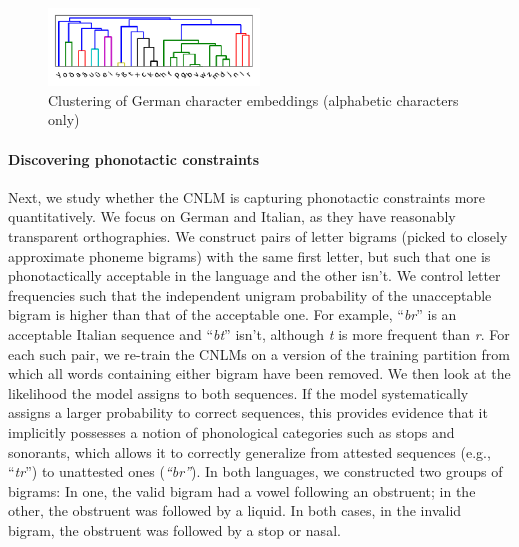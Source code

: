 \begin{figure}
\includegraphics[width=0.50\textwidth]{figures/char-emb-clustering-output_output-phonetic-wiki-german-nospaces-bptt-910515909.pdf}
\caption{Clustering of German character embeddings (alphabetic characters only)}\label{fig:char-clustering}
\end{figure}



\paragraph{Discovering phonotactic constraints}
\label{sec:phonotactics}

Next, we study whether the CNLM is capturing phonotactic constraints
more quantitatively.  We focus on German and Italian, as they
have reasonably transparent orthographies.  We construct pairs of
letter bigrams (picked to closely approximate phoneme bigrams) with
the same first letter, but such that one is phonotactically acceptable
in the language and the other isn't. We control letter frequencies
such that the independent unigram probability of the unacceptable
bigram is higher than that of the acceptable one. For example,
``\emph{br}'' is an acceptable Italian sequence and ``\emph{bt}''
isn't, although \emph{t} is more frequent than \emph{r}.  For each
such pair, we re-train the CNLMs on a version of the training partition
from which all words containing either bigram have been removed.  We
then look at the likelihood the model assigns to both sequences. If
the model systematically assigns a larger probability to correct
sequences, this provides evidence that it implicitly possesses a
notion of phonological categories such as stops and sonorants, which
allows it to correctly generalize from attested sequences (e.g.,
``\emph{tr}'') to unattested ones (\emph{``br''}). In both languages,
we constructed two groups of bigrams: In one, the valid bigram had a
vowel following an obstruent; in the other, the obstruent was followed by
a liquid.  In both cases, in the invalid bigram, the obstruent was followed by a
stop or nasal.  %

